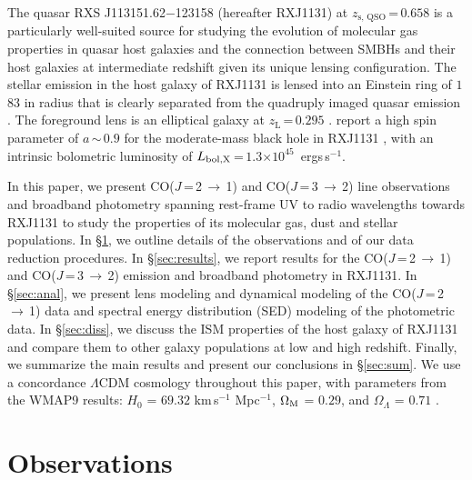 \documentclass[]{emulateapj}
\newcommand{\Msun}{\mbox{$M_{\odot}$}\xspace}
\newcommand{\rarr}{$\rightarrow$}
\newcommand{\bco}{\mbox{CO($J$\,=\,2\,\rarr\,1)}\xspace}
\newcommand{\cco}{\mbox{CO($J$\,=\,3\,\rarr\,2)}\xspace}
\newcommand{\kms}{\mbox{km\,s$^{-1}$}\xspace}
\newcommand{\pmOne}{\mbox{$^{-1}$}\xspace}
\newcommand{\E}[1]{\mbox{$\times10^{#1}$}}
\newcommand{\eq}{\,=\,}
\newcommand{\Sec}[1]{\S\ref{sec:#1}}
\begin{document}
The quasar RXS J113151.62$-$123158 (hereafter RXJ1131)
at $z_\textrm{s, QSO}$\eq$0.658$ \citep[hereafter S03]{Sluse03a} is a particularly well-suited source for
studying the evolution of molecular gas properties in quasar host galaxies and the
connection between SMBHs and their host galaxies at intermediate redshift
given its unique lensing configuration.
The stellar emission in the host galaxy of RXJ1131 is lensed into
an Einstein ring of $1$\farcs$83$ in radius
that is clearly separated from the quadruply imaged quasar emission \citep[hereafter C06]{Claeskens06a}.
The foreground lens is an elliptical galaxy at $z_\textrm{L}$\eq$0.295$ .
\citet[][]{Reis14a} report a high spin parameter of $a$\,$\sim$\,$0.9$ for the moderate-mass black hole in RXJ1131 \citep[$M_{\rm BH}$\eq$8$\E{7}\Msun;][]{Sluse12a},
with an intrinsic bolometric luminosity of $L_{\rm bol, X}$\eq$1.3$\E{45}\, ergs\,s\pmOne \citep{Pooley07a}.

In this paper, we present \bco and \cco line observations and
broadband photometry spanning rest-frame UV to radio wavelengths towards RXJ1131 to
study the properties of its molecular gas, dust and stellar populations.
In \Sec{obs}, we outline details of the observations and of our data reduction procedures.
In \Sec{results}, we report results for the \bco and \cco emission and broadband
photometry in RXJ1131.
In \Sec{anal}, we present lens modeling and dynamical modeling of the \bco data and
spectral energy distribution (SED) modeling of the photometric data.
In \Sec{diss}, we discuss
the ISM properties of the host galaxy of RXJ1131 and compare
them to other galaxy populations at low and high redshift.
Finally, we summarize the main results and present our conclusions in \Sec{sum}.
We use a concordance $\Lambda$CDM cosmology throughout this paper, with
parameters from the WMAP9 results:
$H_0$ = $69.32$ \kms Mpc\pmOne, $\Omega_{\rm M}$ = $0.29$, and
$\Omega_{\Lambda}$ = $0.71$ \citep{Hinshaw13a}.

\section{Observations} \label{sec:obs}
\end{document}
